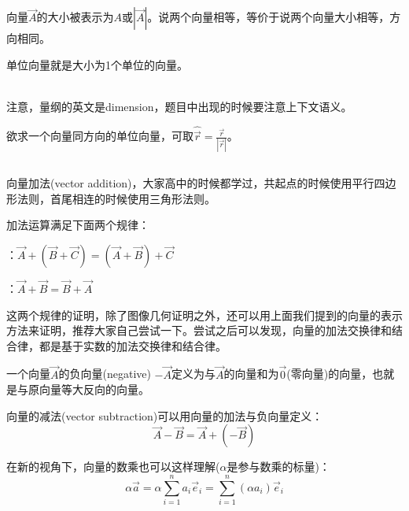 \subsection[向量的大小与单位向量]{}
向量$\vec{A}$的大小被表示为$A$或$\left | \vec{A} \right | $。说两个向量相等，等价于说两个向量大小相等，方向相同。

单位向量就是大小为1个单位的向量。
\begin{Itemize}
	\item {} 
	\\
	注意，量纲的英文是dimension，题目中出现的时候要注意上下文语义。
\end{Itemize}

欲求一个向量同方向的单位向量，可取$\displaystyle\hat{\vec{r}} =\frac{\vec{r} }{\left | \vec{r} \right | } $。
\subsection[向量的运算]{}
向量加法(vector addition)，大家高中的时候都学过，共起点的时候使用平行四边形法则，首尾相连的时候使用三角形法则。

加法运算满足下面两个规律：
\begin{Itemize}
     \item {}：$\vec{A}+(\vec{B}+\vec{C})=(\vec{A}+\vec{B})+\vec{C}$
     \item {}：$\vec{A}+\vec{B}=\vec{B}+\vec{A}$
\end{Itemize}
这两个规律的证明，除了图像几何证明之外，还可以用上面我们提到的向量的表示方法来证明，推荐大家自己尝试一下。尝试之后可以发现，向量的加法交换律和结合律，都是基于实数的加法交换律和结合律。

一个向量$\vec{A}$的负向量(negative) $-\vec{A}$定义为与$\vec{A}$的向量和为$\vec{0}$(零向量)的向量，也就是与原向量等大反向的向量。

向量的减法(vector subtraction)可以用向量的加法与负向量定义：
\[\vec{A}-\vec{B}=\vec{A}+(-\vec{B})\]

在新的视角下，向量的数乘也可以这样理解($\alpha$是参与数乘的标量)：
\[\alpha \vec{a}=\alpha \sum_{i=1}^{n}  a_{i} \vec{e }_{i} =\sum_{i=1}^{n} (\alpha a_{i} )\vec{e }_{i}\]         
          
